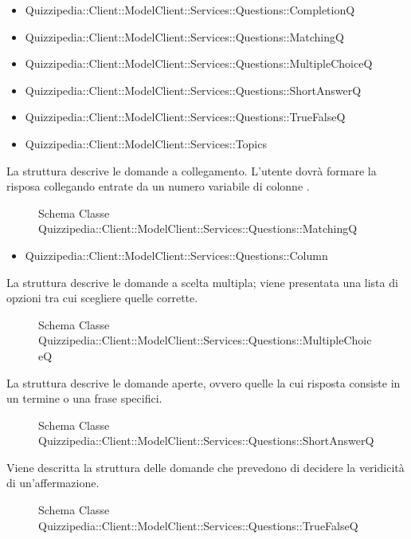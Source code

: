 \begin{itemize}
\item Quizzipedia::Client::ModelClient::Services::Questions::CompletionQ
\item Quizzipedia::Client::ModelClient::Services::Questions::MatchingQ
\item Quizzipedia::Client::ModelClient::Services::Questions::MultipleChoiceQ
\item Quizzipedia::Client::ModelClient::Services::Questions::ShortAnswerQ
\item Quizzipedia::Client::ModelClient::Services::Questions::TrueFalseQ
\item Quizzipedia::Client::ModelClient::Services::Topics
\end{itemize}
La struttura descrive le domande a collegamento. L'utente dovrà formare la risposa collegando entrate da un numero variabile di colonne .
\begin{figure}[H]
\centering
\noindent{}
\caption{Schema Classe Quizzipedia::Client::ModelClient::Services::Questions::MatchingQ}
\end{figure}
\begin{itemize}
\item Quizzipedia::Client::ModelClient::Services::Questions::Column
\end{itemize}
La struttura descrive le domande a scelta multipla; viene presentata una lista di opzioni tra cui scegliere quelle corrette.
\begin{figure}[H]
\centering
\noindent{}
\caption{Schema Classe Quizzipedia::Client::ModelClient::Services::Questions::MultipleChoiceQ}
\end{figure}
La struttura descrive le domande aperte, ovvero quelle la cui risposta consiste in un termine o una frase specifici.
\begin{figure}[H]
\centering
\noindent{}
\caption{Schema Classe Quizzipedia::Client::ModelClient::Services::Questions::ShortAnswerQ}
\end{figure}
Viene descritta la struttura delle domande che prevedono di decidere la veridicità di un'affermazione.
\begin{figure}[H]
\centering
\noindent{}
\caption{Schema Classe Quizzipedia::Client::ModelClient::Services::Questions::TrueFalseQ}
\end{figure}
